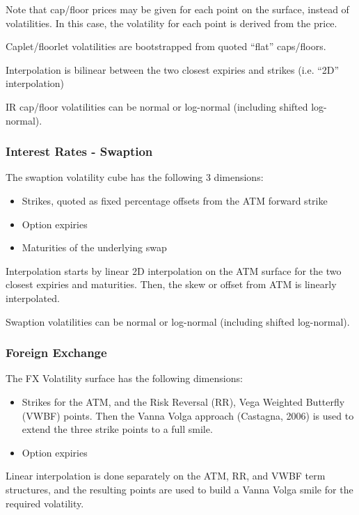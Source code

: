 Note that cap/floor prices may be given for each point on the surface, instead of 
volatilities. In this case, the volatility for each point is derived from the price.

\medskip
Caplet/floorlet volatilities are bootstrapped from quoted ``flat'' caps/floors.

\medskip
Interpolation is bilinear between the two closest expiries and strikes (i.e. ``2D'' 
interpolation)

\medskip
IR cap/floor volatilities can be normal or log-normal (including shifted log-normal).

\subsubsection{Interest Rates - Swaption}
The swaption volatility cube has the following 3 dimensions:
\begin{itemize}
\item Strikes, quoted as fixed percentage offsets from the ATM forward strike
\item Option expiries
\item Maturities of the underlying swap
\end{itemize}

Interpolation starts by linear 2D interpolation on the ATM surface for the two 
closest expiries and maturities. Then, the skew or offset from ATM is linearly 
interpolated. 

\medskip
Swaption volatilities can be normal or log-normal (including shifted log-normal).

\subsubsection{Foreign Exchange}

The FX Volatility surface has the following dimensions:
\begin{itemize}
\item Strikes for the ATM, and the Risk Reversal (RR), Vega Weighted 
Butterfly (VWBF) points. Then the Vanna Volga approach (Castagna, 2006) is used to 
extend the three strike points to a full smile.
\item Option expiries
\end{itemize}

Linear interpolation is done separately on the ATM, RR, and VWBF term structures, 
and the resulting points are used to build a Vanna Volga smile for the required 
volatility. 

